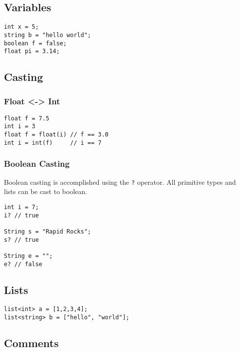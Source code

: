 \subsection*{Variables}\label{variables}

\begin{verbatim}
int x = 5;
string b = "hello world";
boolean f = false;
float pi = 3.14;
\end{verbatim}

\subsection*{Casting}\label{casting}

\subsubsection*{Float \textless{}-\textgreater{} Int}\label{float---int}

\begin{verbatim}
float f = 7.5
int i = 3
float f = float(i) // f == 3.0
int i = int(f)     // i == 7
\end{verbatim}

\subsubsection*{Boolean Casting}\label{boolean-casting}

Boolean casting is accomplished using the \texttt{?} operator. All
primitive types and lists can be cast to boolean.

\begin{verbatim}
int i = 7;
i? // true

String s = "Rapid Rocks";
s? // true

String e = "";
e? // false
\end{verbatim}

\subsection*{Lists}\label{lists}

\begin{verbatim}
list<int> a = [1,2,3,4];
list<string> b = ["hello", "world"];
\end{verbatim}

\subsection*{Comments}\label{comments}

